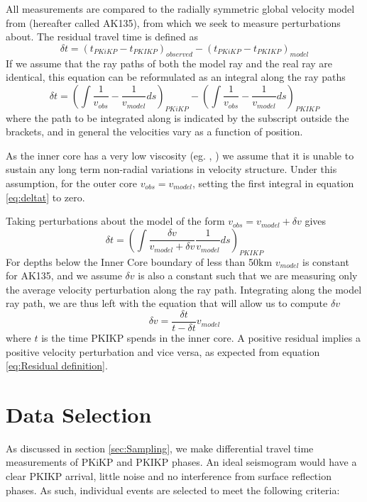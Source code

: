 \documentclass[11pt,a4paper]{article}
\begin{document}
All measurements are compared to the radially symmetric global velocity model from \cite{Kennett1995b} (hereafter called AK135), from which we seek to measure perturbations about. The residual travel time is defined as
\begin{equation}
	\delta t = \left ( t_{PKiKP} - t_{PKIKP} \right )_{observed} -  \left ( t_{PKiKP} - t_{PKIKP} \right )_{model}
	\label{eq:Residual definition}
\end{equation}
If we assume that the ray paths of both the model ray and the real ray are identical, this equation can be reformulated as an integral along the ray paths
\begin{equation}
		\delta t = \left (  \int \frac{1}{v_{obs}} - \frac{1}{v_{model}} ds  \right )_{PKiKP} - \left (  \int \frac{1}{v_{obs}} - \frac{1}{v_{model}} ds \right )_{PKIKP}
		\label{eq:deltat}
\end{equation}
where the path to be integrated along is indicated by the subscript outside the brackets, and in general the velocities vary as a function of position.

As the inner core has a very low viscosity (eg. \cite{Wijs1998}, \cite{Zhang2000}) we assume that it is unable to sustain any long term non-radial variations in velocity structure. Under this assumption, for the outer core $v_{obs} = v_{model}$, setting the first integral in equation \eqref{eq:deltat} to zero.

Taking perturbations about the model of the form $v_{obs} = v_{model} + \delta v$ gives
\begin{equation}
	\delta t =\left ( \int \frac{\delta v}{v_{model} + \delta v }\frac{1}{v_{model}} ds \right )_{PKIKP}
\end{equation}
For depths below the Inner Core boundary of less than 50km $v_{model}$ is constant for AK135, and we assume $\delta v$ is also a constant such that we are measuring only the average velocity perturbation along the ray path. Integrating along the model ray path, we are thus left with the equation that will allow us to compute $\delta v$
\begin{equation}
	\delta v = \frac{\delta t}{t - \delta t} v_{model}
	\label{eq:Delta v}
\end{equation}
where $t$ is the time PKIKP spends in the inner core. A positive residual implies a positive velocity perturbation and vice versa, as expected from equation \eqref{eq:Residual definition}.

\section{Data Selection}
\label{sec:Data}
As discussed in section \ref{sec:Sampling}, we make differential travel time measurements of PKiKP and PKIKP phases. An ideal seismogram would have a clear PKIKP arrival, little noise and no interference from surface reflection phases. As such, individual events are selected to meet the following criteria:
\end{document}
